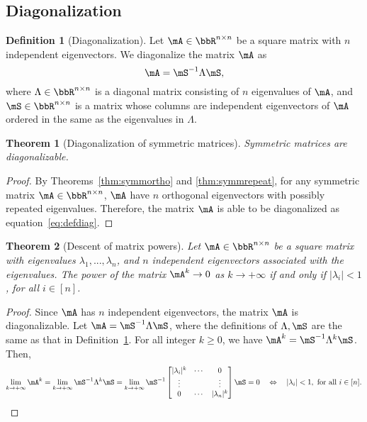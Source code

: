 \documentclass[11pt]{article}
\theoremstyle{plain}
\newtheorem{thm}{Theorem}[section]
\theoremstyle{definition}
\newtheorem{defn}{Definition}
\begin{document}
\subsection{Diagonalization}

\begin{defn}[Diagonalization]\label{def:diagonalization}
	Let  $\mA \in \bbR^{n \times n}$ be a square matrix with $n$ independent eigenvectors. We diagonalize the matrix $\mA$ as
	\begin{equation}\label{eq:defdiag}
		\mA = \mS^{-1} \Lambda \mS,
	\end{equation}
	where $\Lambda \in \bbR^{n \times n}$ is a diagonal matrix consisting of $n$ eigenvalues of $\mA$, and  $\mS \in \bbR^{n \times n}$ is a matrix whose columns are independent eigenvectors of $\mA$ ordered in the same as the eigenvalues in $\Lambda$.
\end{defn}

\begin{thm}[Diagonalization of symmetric matrices]
Symmetric matrices are diagonalizable.
\end{thm}

\begin{proof}
	By Theorems~\ref{thm:symmortho} and \ref{thm:symmrepeat}, for any symmetric matrix $\mA \in \bbR^{n \times n}$, $\mA$ have $n$ orthogonal eigenvectors with possibly repeated eigenvalues. Therefore, the matrix $\mA$   is able to be diagonalized as equation~\eqref{eq:defdiag}.
\end{proof}

\begin{thm}[Descent of matrix powers]
	Let $\mA \in \bbR^{n \times n}$ be  a square matrix with eigenvalues $\lambda_1,...,\lambda_n$, and  $n$ independent eigenvectors associated with the eigenvalues. The power of the matrix $\mA^k \rightarrow 0$ as $k \rightarrow +\infty$ if and only if $|\lambda_i| < 1$, for all $i \in [n]$.
\end{thm}

\begin{proof}
Since $\mA$ has $n$ independent eigenvectors, the matrix $\mA$ is diagonalizable.
	Let $\mA =\mS^{-1} \Lambda \mS$, where the definitions of $\Lambda, \mS$ are the same as that in Definition~\ref{def:diagonalization}. For all integer $k\geq 0$, we have $\mA^k = \mS^{-1} \Lambda^{k} \mS$. Then,
	\[ \lim_{k \rightarrow +\infty} \mA^k = \lim_{k \rightarrow +\infty} \mS^{-1} \Lambda^{k} \mS  =  \lim_{k \rightarrow +\infty} \mS^{-1} \begin{bmatrix}
		|\lambda_i|^k & \cdots &0\\
		\vdots & &\vdots\\
		0 & \cdots & |\lambda_n|^k
	\end{bmatrix} \mS  = 0 \quad \Leftrightarrow \quad  |\lambda_i| < 1, \text{ for all } i \in [n]. \]
\end{proof}
\end{document}
